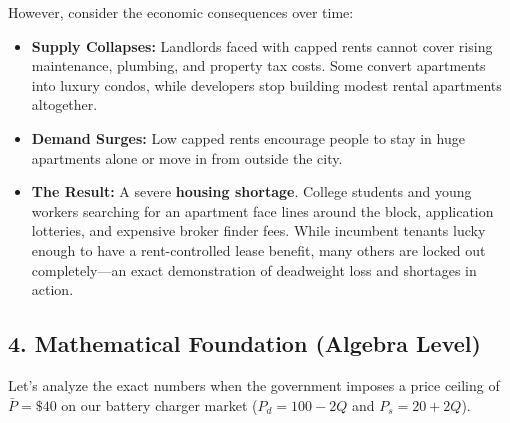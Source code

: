 \documentclass[11pt,letterpaper]{article}
\begin{document}
However, consider the economic consequences over time:
\begin{itemize}
    \item \textbf{Supply Collapses:} Landlords faced with capped rents cannot cover rising maintenance, plumbing, and property tax costs. Some convert apartments into luxury condos, while developers stop building modest rental apartments altogether.
    \item \textbf{Demand Surges:} Low capped rents encourage people to stay in huge apartments alone or move in from outside the city.
    \item \textbf{The Result:} A severe \textbf{housing shortage}. College students and young workers searching for an apartment face lines around the block, application lotteries, and expensive broker finder fees. While incumbent tenants lucky enough to have a rent-controlled lease benefit, many others are locked out completely—an exact demonstration of deadweight loss and shortages in action.
\end{itemize}

\subsection*{4. Mathematical Foundation (Algebra Level)}
Let's analyze the exact numbers when the government imposes a price ceiling of $\bar{P} = \$40$ on our battery charger market ($P_d = 100 - 2Q$ and $P_s = 20 + 2Q$).
\end{document}
